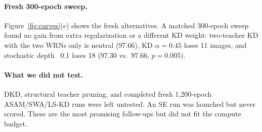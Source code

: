 \paragraph{Fresh 300-epoch sweep.}
Figure~\ref{fig:curves}(e) shows the fresh alternatives. A matched
300-epoch sweep found no gain from extra regularization or a different KD weight:
two-teacher KD with the two WRNs only is neutral (97.66), KD $\alpha=0.45$ loses 11 images, and
stochastic depth~\citep{huang2016deep} 0.1 loses 18 (97.30 vs.\ 97.66, $p=0.005$).



\paragraph{What we did not test.}
DKD, structural teacher pruning, and completed fresh 1,200-epoch ASAM/SWA/LS-KD
runs were left untested. An SE run was launched but never scored. These are the
most promising follow-ups but did not fit the compute budget.
